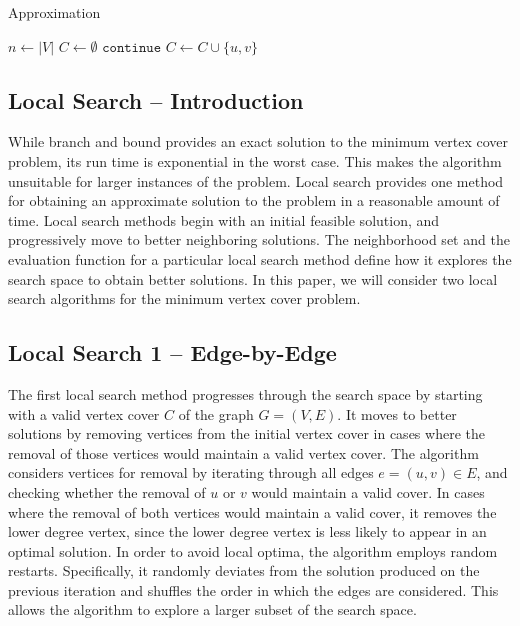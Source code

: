 \documentclass{sig-alternate-05-2015}
\begin{document}
\begin{algorithm}
\LinesNumbered
\DontPrintSemicolon
\BlankLine
 

\caption{Approximation}

\BlankLine
\Begin
{
	$ n \leftarrow |V|$\;
	$ C \leftarrow \emptyset$ \;
	{
		{
			$\texttt{continue}$\;
		}
		\Else{}
		{
			$ C \leftarrow C \cup \lbrace u,v \rbrace$\;
		}
	}
	\;
}
\end{algorithm}

\subsection{Local Search -- Introduction}
While branch and bound provides an exact solution to the minimum vertex cover problem, its run time is exponential in the worst case. This makes the algorithm unsuitable for larger instances of the problem. Local search provides one method for obtaining an approximate solution to the problem in a reasonable amount of time. Local search methods begin with an initial feasible solution, and progressively move to better neighboring solutions. The neighborhood set and the evaluation function for a particular local search method define how it explores the search space to obtain better solutions. In this paper, we will consider two local search algorithms for the minimum vertex cover problem.

\subsection{Local Search 1 -- Edge-by-Edge}
The first local search method progresses through the search space by starting with a valid vertex cover $C$ of the graph $G=(V,E)$. It moves to better solutions by removing vertices from the initial vertex cover in cases where the removal of those vertices would maintain a valid vertex cover. The algorithm considers vertices for removal by iterating through all edges $e=(u,v) \in E$, and checking whether the removal of $u$ or $v$ would maintain a valid cover. In cases where the removal of both vertices would maintain a valid cover, it removes the lower degree vertex, since the lower degree vertex is less likely to appear in an optimal solution. In order to avoid local optima, the algorithm employs random restarts. Specifically, it randomly deviates from the solution produced on the previous iteration and shuffles the order in which the edges are considered. This allows the algorithm to explore a larger subset of the search space.
\end{document}
